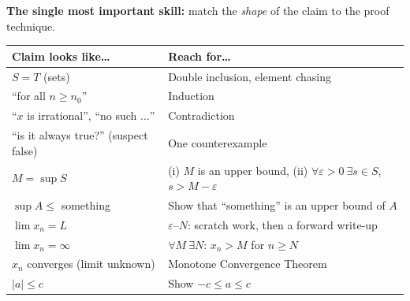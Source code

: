 \documentclass[11pt]{article}
\theoremstyle{definition}
\newcommand{\eps}{\varepsilon}
\newcommand{\key}[1]{\textcolor{red!70!black}{\textbf{#1}}}
\begin{document}
\medskip
\noindent\key{The single most important skill:} match the \emph{shape}
of the claim to the proof technique.

\begin{center}
\renewcommand{\arraystretch}{1.3}
\begin{tabular}{|p{6cm}|p{8.5cm}|}
\hline
\textbf{Claim looks like\ldots} & \textbf{Reach for\ldots}\\ \hline
$S=T$ (sets) & Double inclusion, element chasing \\ \hline
``for all $n\ge n_0$'' & Induction \\ \hline
``$x$ is irrational'', ``no such $\ldots$'' & Contradiction \\ \hline
``is it always true?'' (suspect false) & One counterexample \\ \hline
$M=\sup S$ & (i) $M$ is an upper bound, (ii) $\forall\eps>0\ \exists s\in S$, $s>M-\eps$ \\ \hline
$\sup A \le$ something & Show that ``something'' is an upper bound of $A$ \\ \hline
$\lim x_n = L$ & $\eps$--$N$: scratch work, then a forward write-up \\ \hline
$\lim x_n=\infty$ & $\forall M\ \exists N$: $x_n>M$ for $n\ge N$ \\ \hline
$x_n$ converges (limit unknown) & Monotone Convergence Theorem \\ \hline
$|a|\le c$ & Show $-c\le a\le c$ \\ \hline
\end{tabular}
\end{center}
\end{document}
